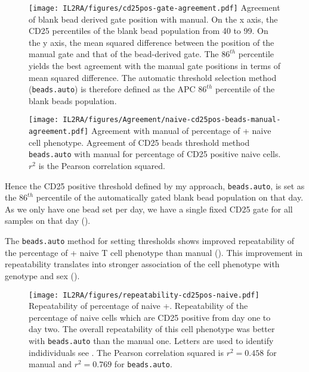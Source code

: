 \begin{figure}[h]
\centering
  \texttt{[image: IL2RA/figures/cd25pos-gate-agreement.pdf]}
{ Agreement of blank bead derived gate position with manual. }
{
On the x axis, the CD25 percentiles of the blank bead population from 40 to 99.
On the y axis, the mean squared difference between the position of the manual gate and that of the bead-derived gate.
The $86^{th}$ percentile yields the best agreement with the manual gate positions in terms of mean squared difference.
The automatic threshold selection method (\texttt{beads.auto}) is therefore defined as the APC $86^{th}$ percentile of the blank beads population.
}
\end{figure}

\begin{figure}[h]
\centering
  \texttt{[image: IL2RA/figures/Agreement/naive-cd25pos-beads-manual-agreement.pdf]}
{ Agreement with manual of percentage of + naive cell phenotype. }
{
Agreement of CD25 beads threshold method \texttt{beads.auto} with manual for percentage of CD25 positive naive cells.
$r^2$ is the Pearson correlation squared.
}
\end{figure}

Hence the CD25 positive threshold defined by my approach, \texttt{beads.auto}, is set as the $86^{th}$ percentile of the automatically gated blank bead population on that day.
As we only have one bead set per day, we have a single fixed CD25 gate for all samples on that day ().

The \texttt{beads.auto} method for setting  thresholds  shows improved repeatability of the percentage of + naive T cell phenotype
than manual ().  
This improvement in repeatability translates into stronger association of the cell phenotype with genotype and sex ().


\begin{figure}[h]
\centering
\texttt{[image: IL2RA/figures/repeatability-cd25pos-naive.pdf]}
{Repeatability of percentage of naive +.}
{
Repeatability of the percentage of naive cells which are CD25 positive from day one to day two.
The overall repeatability of this cell phenotype was better with \texttt{beads.auto} than the manual one.
Letters are used to identify indidividuals see .
The Pearson correlation squared is $r^2=0.458$ for manual and $r^2=0.769$ for \texttt{beads.auto}.
}
\end{figure}

